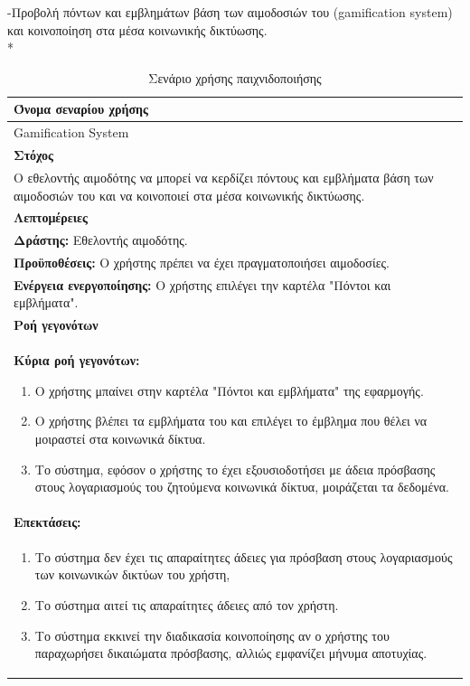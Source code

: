 -Προβολή πόντων και εμβλημάτων βάση των αιμοδοσιών του (gamification system) και κοινοποίηση στα μέσα κοινωνικής δικτύωσης.
\\*
\begin{table}[H]
	\begin{center}
	    \begin{tabular}{|p{\dimexpr \linewidth-2\tabcolsep}|}
	    \hline
	    \rowcolor{grayy}
	    \textbf{Όνομα σεναρίου χρήσης}
	    \\ \hline    
	     Gamification System
	     \\ \hline
	    \rowcolor{grayy}
	    \textbf{\textbf{Στόχος}}
	    \\ \hline
	 	 Ο εθελοντής αιμοδότης να μπορεί να κερδίζει πόντους και εμβλήματα βάση των αιμοδοσιών του και να κοινοποιεί στα μέσα κοινωνικής δικτύωσης.
	    \\ \hline
	    \rowcolor{grayy}
	    \textbf{Λεπτομέρειες}
	    \\ \hline
		\textbf{Δράστης:} Εθελοντής αιμοδότης.
		\\*
		\textbf{Προϋποθέσεις:} Ο χρήστης πρέπει να έχει πραγματοποιήσει αιμοδοσίες.
		\\*
		\textbf{Ενέργεια ενεργοποίησης:} Ο χρήστης επιλέγει την καρτέλα "Πόντοι και εμβλήματα".
		\\ \hline
		\rowcolor{grayy}    
	    \textbf{Ροή γεγονότων}
	    \\* 
		\textbf{Κύρια ροή γεγονότων:}
		\begin{enumerate}
		\item	 Ο χρήστης μπαίνει  στην καρτέλα "Πόντοι και εμβλήματα" της εφαρμογής.
		\item Ο χρήστης βλέπει τα εμβλήματα του και επιλέγει το έμβλημα που θέλει να μοιραστεί στα κοινωνικά δίκτυα.
		\item Το σύστημα, εφόσον ο χρήστης το έχει εξουσιοδοτήσει με άδεια πρόσβασης στους λογαριασμούς του ζητούμενα κοινωνικά δίκτυα, μοιράζεται τα δεδομένα.
		\end{enumerate}
		\\ \hline
		\textbf{Επεκτάσεις:}
		   \\ \hline
		\begin{enumerate}
			\item Το σύστημα δεν έχει τις απαραίτητες άδειες για πρόσβαση στους λογαριασμούς των κοινωνικών δικτύων του χρήστη,
			\item Το σύστημα αιτεί τις απαραίτητες άδειες από τον χρήστη.
			\item Το σύστημα εκκινεί την διαδικασία κοινοποίησης αν ο χρήστης του παραχωρήσει δικαιώματα πρόσβασης, αλλιώς εμφανίζει μήνυμα αποτυχίας.
		\end{enumerate}
		\\ \hline
	    \end{tabular}
	    \caption{Σενάριο χρήσης παιχνιδοποιήσης}
	    \label{tab:use_case_gamification} 
	\end{center}
\end{table}



